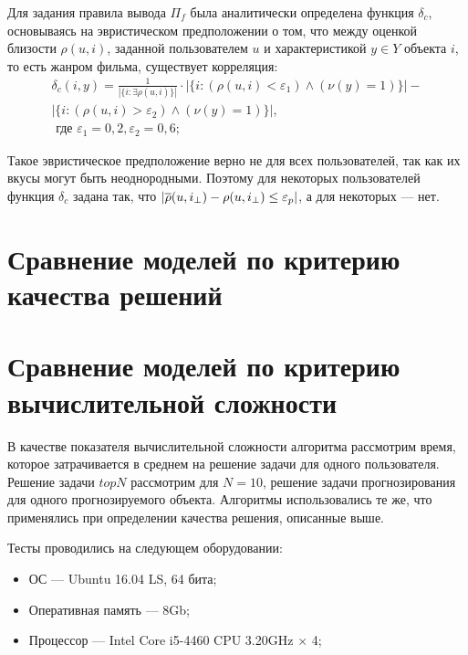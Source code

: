 Для задания правила вывода $\Pi_f$ была аналитически определена
функция $\delta_c$, основываясь на эвристическом предположении о том,
что между оценкой близости $\rho(u, i)$, заданной пользователем $u$
и характеристикой $y \in Y$ объекта $i$,
то есть жанром фильма, существует корреляция:
\begin{multline}
	\delta_c(i, y) = \frac{1}{|\{i: \exists \rho(u,i)\}|}
	\cdot
	|\{ i : (\rho(u, i) < \varepsilon_1) \wedge (\nu(y) = 1)\}| -\\
	|\{ i : (\rho(u, i) > \varepsilon_2) \wedge (\nu(y) = 1)\}|, \\
	\text{ где }
	\varepsilon_1 = 0,2, \varepsilon_2 = 0,6;
\end{multline}

Такое эвристическое предположение верно не для всех пользователей, так как
их вкусы могут быть неоднородными. Поэтому для некоторых пользователей функция
$\delta_c$ задана так, что
$|\overline{\rho}(u, i_{\bot}) - \rho(u, i_{\bot}) \le \varepsilon_p|$,
а для некоторых --- нет.

\section{Сравнение моделей по критерию качества решений}


%


\section{Сравнение моделей по критерию вычислительной сложности}
В качестве показателя вычислительной сложности алгоритма рассмотрим время,
которое затрачивается в среднем на решение задачи для одного пользователя.
Решение задачи $topN$ рассмотрим для $N = 10$, решение задачи прогнозирования
для одного прогнозируемого объекта. Алгоритмы использовались те же, что
применялись при определении качества решения, описанные выше.

Тесты проводились на следующем оборудовании:
\begin{itemize}
	\item ОС --- Ubuntu 16.04 LS, 64 бита;
	\item Оперативная память --- 8Gb;
	\item Процессор --- Intel Core i5-4460 CPU \@ 3.20GHz $\times$ 4;
\end{itemize}


